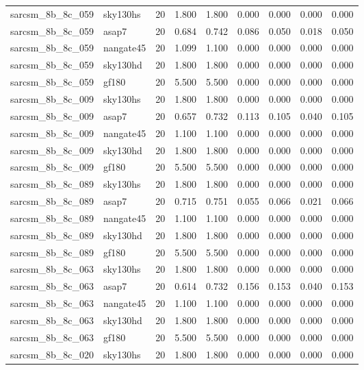 \begin{tabular}{llrrrrrrr}
sarcsm\_8b\_8c\_059 & sky130hs & 20 & 1.800 & 1.800 & 0.000 & 0.000 & 0.000 & 0.000 \\
sarcsm\_8b\_8c\_059 & asap7 & 20 & 0.684 & 0.742 & 0.086 & 0.050 & 0.018 & 0.050 \\
sarcsm\_8b\_8c\_059 & nangate45 & 20 & 1.099 & 1.100 & 0.000 & 0.000 & 0.000 & 0.000 \\
sarcsm\_8b\_8c\_059 & sky130hd & 20 & 1.800 & 1.800 & 0.000 & 0.000 & 0.000 & 0.000 \\
sarcsm\_8b\_8c\_059 & gf180 & 20 & 5.500 & 5.500 & 0.000 & 0.000 & 0.000 & 0.000 \\
sarcsm\_8b\_8c\_009 & sky130hs & 20 & 1.800 & 1.800 & 0.000 & 0.000 & 0.000 & 0.000 \\
sarcsm\_8b\_8c\_009 & asap7 & 20 & 0.657 & 0.732 & 0.113 & 0.105 & 0.040 & 0.105 \\
sarcsm\_8b\_8c\_009 & nangate45 & 20 & 1.100 & 1.100 & 0.000 & 0.000 & 0.000 & 0.000 \\
sarcsm\_8b\_8c\_009 & sky130hd & 20 & 1.800 & 1.800 & 0.000 & 0.000 & 0.000 & 0.000 \\
sarcsm\_8b\_8c\_009 & gf180 & 20 & 5.500 & 5.500 & 0.000 & 0.000 & 0.000 & 0.000 \\
sarcsm\_8b\_8c\_089 & sky130hs & 20 & 1.800 & 1.800 & 0.000 & 0.000 & 0.000 & 0.000 \\
sarcsm\_8b\_8c\_089 & asap7 & 20 & 0.715 & 0.751 & 0.055 & 0.066 & 0.021 & 0.066 \\
sarcsm\_8b\_8c\_089 & nangate45 & 20 & 1.100 & 1.100 & 0.000 & 0.000 & 0.000 & 0.000 \\
sarcsm\_8b\_8c\_089 & sky130hd & 20 & 1.800 & 1.800 & 0.000 & 0.000 & 0.000 & 0.000 \\
sarcsm\_8b\_8c\_089 & gf180 & 20 & 5.500 & 5.500 & 0.000 & 0.000 & 0.000 & 0.000 \\
sarcsm\_8b\_8c\_063 & sky130hs & 20 & 1.800 & 1.800 & 0.000 & 0.000 & 0.000 & 0.000 \\
sarcsm\_8b\_8c\_063 & asap7 & 20 & 0.614 & 0.732 & 0.156 & 0.153 & 0.040 & 0.153 \\
sarcsm\_8b\_8c\_063 & nangate45 & 20 & 1.100 & 1.100 & 0.000 & 0.000 & 0.000 & 0.000 \\
sarcsm\_8b\_8c\_063 & sky130hd & 20 & 1.800 & 1.800 & 0.000 & 0.000 & 0.000 & 0.000 \\
sarcsm\_8b\_8c\_063 & gf180 & 20 & 5.500 & 5.500 & 0.000 & 0.000 & 0.000 & 0.000 \\
sarcsm\_8b\_8c\_020 & sky130hs & 20 & 1.800 & 1.800 & 0.000 & 0.000 & 0.000 & 0.000 \\

\end{tabular}
